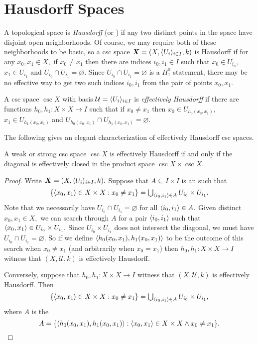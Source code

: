 \documentclass[csc]{subfiles}
\begin{document}
\section{Hausdorff Spaces}

A topological space is \emph{Hausdorff} (or ) if any two distinct points in the space have disjoint open neighborhoods.
Of course, we may require both of these neighborhoods to be basic, so a csc space \(\boldsymbol{X} = (X,\langle U_i\rangle_{i \in I},k)\) is Hausdorff if for any \(x_0,x_1 \in X,\) if \(x_0 \neq x_1\) then there are indices \(i_0,i_1 \in I\) such that \(x_0 \in U_{i_0},\) \(x_1 \in U_{i_1}\) and \(U_{i_0} \cap U_{i_1} = \varnothing.\)
Since \(U_{i_0} \cap U_{i_1} = \varnothing\) is a \(\Pi^0_1\) statement, there may be no effective way to get two such indices \(i_0,i_1\) from the pair of points \(x_0,x_1.\)


\begin{definition}[\RCA]
  A csc space \(\csc{X}\) with basis \(\mathcal{U}=\langle U_i\rangle_{i\in I}\) is \emph{effectively Hausdorff} if there are functions \(h_0,h_1:X \times X \to I\) such that if \(x_0 \neq x_1\) then \(x_0 \in U_{h_0(x_0,x_1)},\) \(x_1 \in U_{h_1(x_0,x_1)}\) and \(U_{h_0(x_0,x_1)} \cap U_{h_1(x_0,x_1)} = \varnothing.\)
\end{definition}

\noindent
The following gives an elegant characterization of effectively Hausdorff csc spaces.

\begin{proposition}[\RCA]\label{P:HausdorffDiagonal}
  A weak or strong csc space \(\csc{X}\) is effectively Hausdorff if and only if the diagonal is effectively closed in the product space \(\csc{X}\times\csc{X}.\)
\end{proposition}

\begin{proof}
  Write \(\boldsymbol{X} = (X,\langle U_i\rangle_{i\in I},k).\)
  Suppose that \(A \subseteq I \times I\) is an \eset{} such that \[\lbrace\langle x_0,x_1\rangle \in X\times X : x_0 \neq x_1\rbrace = {\textstyle\bigcup_{\langle i_0,i_1\rangle \in A} U_{i_0} \times U_{i_1}}.\]
  Note that we necessarily have \(U_{i_0} \cap U_{i_1} = \varnothing\) for all \(\langle i_0,i_1\rangle \in A.\)
  Given distinct \(x_0,x_1 \in X,\) we can search through \(A\) for a pair \(\langle i_0,i_1\rangle\) such that \(\langle x_0,x_1\rangle \in U_{i_0}\times U_{i_1}.\) 
  Since \(U_{i_0}\times U_{i_1}\) does not intersect the diagonal, we must have \(U_{i_0} \cap U_{i_1} = \varnothing.\)
  So if we define \(\langle h_0(x_0,x_1),h_1(x_0,x_1)\rangle\) to be the outcome of this search when \(x_0 \neq x_1\) (and arbitrarily when \(x_0 = x_1\)) then \(h_0,h_1:X \times X \to I\) witness that \((X,\mathcal{U},k)\) is effectively Hausdorff.

  Conversely, suppose that \(h_0,h_1: X\times X \to I\) witness that \((X,\mathcal{U},k)\) is effectively Hausdorff.
  Then \[\lbrace\langle x_0,x_1\rangle \in X \times X : x_0 \neq x_1\rbrace = {\textstyle\bigcup_{\langle i_0,i_1\rangle \in A} U_{i_0}\times U_{i_1}},\] where \(A\) is the \eset{} \[A = \lbrace\langle h_0(x_0,x_1),h_1(x_0,x_1)\rangle : \langle x_0,x_1\rangle \in X \times X \land x_0 \neq x_1\rbrace.\qedhere\]
\end{proof}
\end{document}
